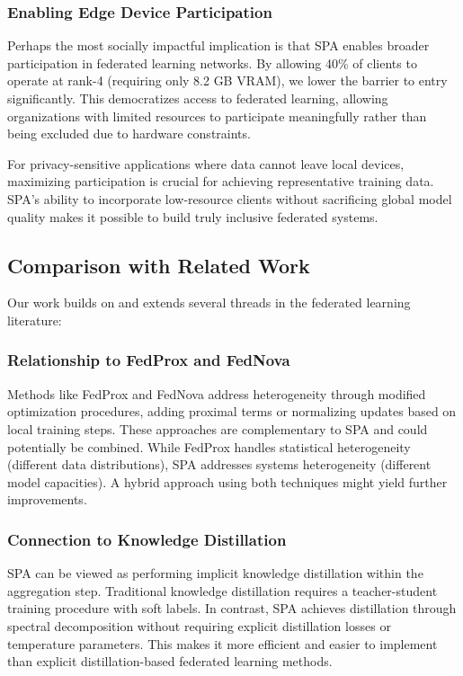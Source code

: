 \documentclass[conference]{IEEEtran}
\begin{document}
\subsubsection{Enabling Edge Device Participation}

Perhaps the most socially impactful implication is that SPA enables broader participation in federated learning networks. By allowing 40\% of clients to operate at rank-4 (requiring only 8.2 GB VRAM), we lower the barrier to entry significantly. This democratizes access to federated learning, allowing organizations with limited resources to participate meaningfully rather than being excluded due to hardware constraints.

For privacy-sensitive applications where data cannot leave local devices, maximizing participation is crucial for achieving representative training data. SPA's ability to incorporate low-resource clients without sacrificing global model quality makes it possible to build truly inclusive federated systems.

\subsection{Comparison with Related Work}

Our work builds on and extends several threads in the federated learning literature:

\subsubsection{Relationship to FedProx and FedNova}

Methods like FedProx and FedNova address heterogeneity through modified optimization procedures, adding proximal terms or normalizing updates based on local training steps. These approaches are complementary to SPA and could potentially be combined. While FedProx handles statistical heterogeneity (different data distributions), SPA addresses systems heterogeneity (different model capacities). A hybrid approach using both techniques might yield further improvements.

\subsubsection{Connection to Knowledge Distillation}

SPA can be viewed as performing implicit knowledge distillation within the aggregation step. Traditional knowledge distillation requires a teacher-student training procedure with soft labels. In contrast, SPA achieves distillation through spectral decomposition without requiring explicit distillation losses or temperature parameters. This makes it more efficient and easier to implement than explicit distillation-based federated learning methods.
\end{document}
